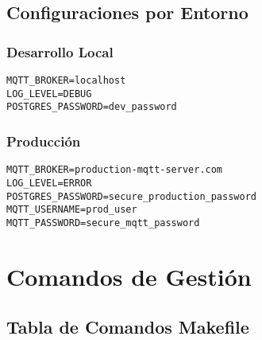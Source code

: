 \subsection{Configuraciones por Entorno}

\subsubsection{Desarrollo Local}
\begin{verbatim}
MQTT_BROKER=localhost
LOG_LEVEL=DEBUG
POSTGRES_PASSWORD=dev_password
\end{verbatim}

\subsubsection{Producción}
\begin{verbatim}
MQTT_BROKER=production-mqtt-server.com
LOG_LEVEL=ERROR
POSTGRES_PASSWORD=secure_production_password
MQTT_USERNAME=prod_user
MQTT_PASSWORD=secure_mqtt_password
\end{verbatim}

\section{Comandos de Gestión}

\subsection{Tabla de Comandos Makefile}

